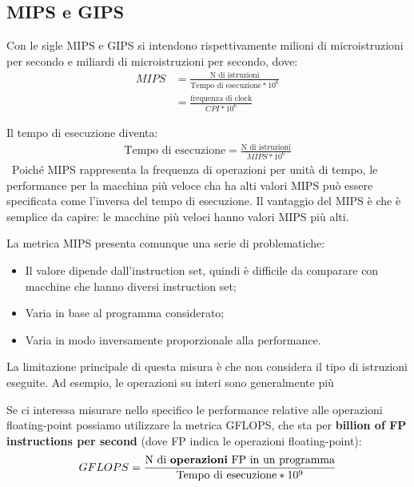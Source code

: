 \subsection{MIPS e GIPS}
Con le sigle MIPS e GIPS si intendono rispettivamente milioni di microistruzioni per secondo e miliardi di microistruzioni per secondo, dove:
\begin{align*}
    MIPS &= \frac{\text{N di istruzioni}}{\text{Tempo di esecuzione} * 10^6}\\
    &= \frac{\text{frequenza di clock}}{CPI * 10^6}
\end{align*}

Il tempo di esecuzione diventa:
\begin{align*}
    \text{Tempo di esecuzione} = \frac{\text{N di istruzioni}}{MIPS * 10^6}
\end{align*}
\
Poiché MIPS rappresenta la frequenza di operazioni per unità di tempo, le performance per la macchina più veloce cha ha alti valori MIPS può essere specificata come l'inversa del tempo di esecuzione. Il vantaggio del MIPS è che è semplice da capire: le macchine più veloci hanno valori MIPS più alti. 

La metrica MIPS presenta comunque una serie di problematiche:
\begin{itemize}
    \item Il valore dipende dall'instruction set, quindi è difficile da comparare con macchine che hanno diversi instruction set;
    \item Varia in base al programma considerato;
    \item Varia in modo inversamente proporzionale alla performance.
\end{itemize}

La limitazione principale di questa misura è che non considera il tipo di istruzioni eseguite. Ad esempio, le operazioni su interi sono generalmente più







Se ci interessa misurare nello specifico le performance relative alle operazioni floating-point possiamo utilizzare la metrica GFLOPS, che sta per \textbf{billion of FP instructions per second} (dove FP indica le operazioni floating-point):
\begin{align*}
    GFLOPS = \frac{\text{N di \textbf{operazioni} FP in un programma}}{\text{Tempo di esecuzione} * 10^9}
\end{align*}

